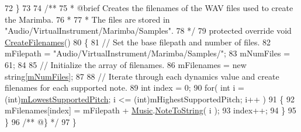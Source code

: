 \begin{DoxyCodeInclude}
72     \}
73 \textcolor{comment}{}
74 \textcolor{comment}{    /**}
75 \textcolor{comment}{     * @brief Creates the filenames of the WAV files used to create the Marimba.}
76 \textcolor{comment}{     * }
77 \textcolor{comment}{     * The files are stored in "Audio/VirtualInstrument/Marimba/Samples".}
78 \textcolor{comment}{    */} 
79     \textcolor{keyword}{protected} \textcolor{keyword}{override} \textcolor{keywordtype}{void} \hyperlink{group___mar_virt_func_gae57d9737fd07708dc7e13e74ee777878}{CreateFilenames}()
80     \{
81         \textcolor{comment}{// Set the base filepath and number of files.}
82         mFilepath = \textcolor{stringliteral}{"Audio/VirtualInstrument/Marimba/Samples/"};
83         mNumFiles = 61;
84 
85         \textcolor{comment}{// Initialize the array of filenames.}
86         mFilenames = \textcolor{keyword}{new} \textcolor{keywordtype}{string}[\hyperlink{group___v_i_base_pro_var_ga9a602db8c9833ce75d95dd453c27d341}{mNumFiles}];
87 
88         \textcolor{comment}{// Iterate through each dynamics value and create filenames for each supported note.}
89         \textcolor{keywordtype}{int} index = 0;
90         \textcolor{keywordflow}{for}( \textcolor{keywordtype}{int} i = (\textcolor{keywordtype}{int})\hyperlink{group___v_i_base_pro_var_ga3cae52b1bcc0178a8a6b03c7aaf7aac8}{mLowestSupportedPitch}; i <= (int)mHighestSupportedPitch; i++
       )
91         \{
92             mFilenames[index] = mFilepath + \hyperlink{class_music}{Music}.\hyperlink{group___music_stat_func_ga85a22c905d56d4c5f4e62159bfecee8c}{NoteToString}( i );
93             index++;
94         \}
95     \}\textcolor{comment}{}
96 \textcolor{comment}{    /** @\} */}
97 \}
\end{DoxyCodeInclude}
 